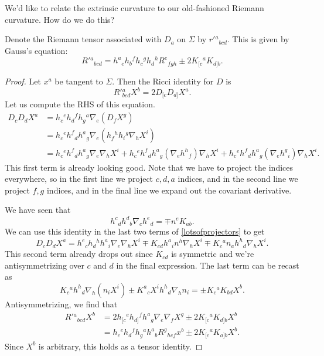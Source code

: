 We'd like to relate the extrinsic curvature to our old-fashioned Riemann curvature. How do we do this?
\begin{prop}
    Denote the Riemann tensor associated with $D_a$ on $\Sigma$ by $r'{}^a{}_{bcd}$. This is given by Gauss's equation:
    \begin{equation}
        R'{}^a{}_{bcd}=h^a{}_e h_b{}^f h_c{}^g h_d{}^h R^e{}_{fgh} \pm 2K_{[c}{}^a K_{d]b}.
    \end{equation}
\end{prop}
\begin{proof}
    Let $x^a$ be tangent to $\Sigma$. Then the Ricci identity for $D$ is
    \begin{equation}
        R'{}^a_{bcd} X^b = 2 D_{[c}D_{d]}X^a.
    \end{equation}
    Let us compute the RHS of this equation.
    \begin{align}
        D_c D_d X^a &= h_c{}^e h_d{}^f h_g{}^a \nabla_e(D_f X^g)\\
        &= h_c{}^e h^f{}_d h^a{}_g \nabla_e (h_f{}^h h_i{}^g \nabla_h X^i)\\
        &=h_c{}^e h^f{}_d h^a{}_g \nabla_e \nabla_h X^i 
        + h_c{}^e h^f{}_d h^a{}_g (\nabla_e h^h{}_f) \nabla_h X^i 
        + h_c{}^e h^f{}_d h^a{}_g (\nabla_e h^g{}_i) \nabla_h X^i.\label{lotsofprojectors}
    \end{align}
    This first term is already looking good. Note that we have to project the indices everywhere, so in the first line we project $c,d,a$ indices, and in the second line we project $f,g$ indices, and in the final line we expand out the covariant derivative.
    
    We have seen that
    \begin{equation}\label{projectorsandcurvature}
        h^c{}_d h^d{}_b \nabla_c h^e{}_d = \mp n^e K_{ab}.
    \end{equation}
    We can use this identity in the last two terms of \ref{lotsofprojectors} to get
    \begin{equation}
        D_c D_d X^a = h^e{}_c h_d{}^h h^a{}_i \nabla_e \nabla_h X^i \mp K_{cd} h^a{}_i n^h \nabla_h X^i \mp K_c{}^a n_a h^h{}_d \nabla_h X^i.
    \end{equation}
    This second term already drops out since $K_{cd}$ is symmetric and we're antisymmetrizing over $c$ and $d$ in the final expression. The last term can be recast as
    \begin{equation}
        K_c{}^a h^h{}_d \nabla_h(n_i X^i)\pm K^a{}_c X^i h^h{}_d \nabla_h n_i = \pm K_c{}^a K_{bd}X^b.
    \end{equation}
    Antisymmetrizing, we find that
    \begin{align*}
        R'{}^a{}_{bcd} X^b &= 2h_{[c}{}^e h_{d]}{}^f h^a{}_g \nabla_e \nabla_f X^g \pm 2 K_{[c}{}^a K_{d]b} X^b\\
        &= h_c{}^e h_d{}^f h_g{}^a h^a{}_b R^g{}_{hef} x^b \pm 2 K_{[c}{}^a K_{a]b}X^b.
    \end{align*}
    Since $X^b$ is arbitrary, this holds as a tensor identity.
\end{proof}
